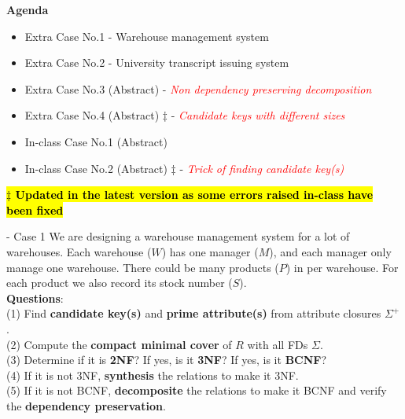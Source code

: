 \begin{frame}
	{\large \textbf{Agenda}}
	\begin{itemize}
		\item Extra Case No.1 - Warehouse management system
		\item Extra Case No.2 - University transcript issuing system
		\item Extra Case No.3 (Abstract) - \textcolor{red}{\textit{Non dependency preserving decomposition}}
		\item Extra Case No.4 (Abstract) $\ddagger$ - \textcolor{red}{\textit{Candidate keys with different sizes}}
		\item In-class Case No.1 (Abstract) 
		\item In-class Case No.2 (Abstract) $\ddagger$ - \textcolor{red}{\textit{Trick of finding candidate key(s)}}
		
	\end{itemize}\vspace{20pt}

	\textcolor{red}{\textbf{\hl{$\ddagger$ Updated in the latest version as some errors raised in-class have been fixed}}}
\end{frame}

\begin{frame}[fragile]{ - Case 1}
	We are designing a warehouse management system for a lot of warehouses. Each warehouse ($W$) has one manager ($M$), and each manager only manage one warehouse. There could be many products ($P$) in per warehouse. For each product we also record its stock number ($S$).\\\vspace{10pt}
	\textbf{Questions}:\\
	(1) Find \textbf{candidate key(s)} and \textbf{prime attribute(s)} from attribute closures $\Sigma^{+}$.\\
	(2) Compute the \textbf{compact minimal cover} of $R$ with all FDs $\Sigma$.\\
	(3) Determine if it is \textbf{2NF}? If yes, is it \textbf{3NF}? If yes, is it \textbf{BCNF}?\\
	(4) If it is not 3NF, \textbf{synthesis} the relations to make it 3NF.\\
	(5) If it is not BCNF, \textbf{decomposite} the relations to make it BCNF and verify the \textbf{dependency preservation}. 
\end{frame}

